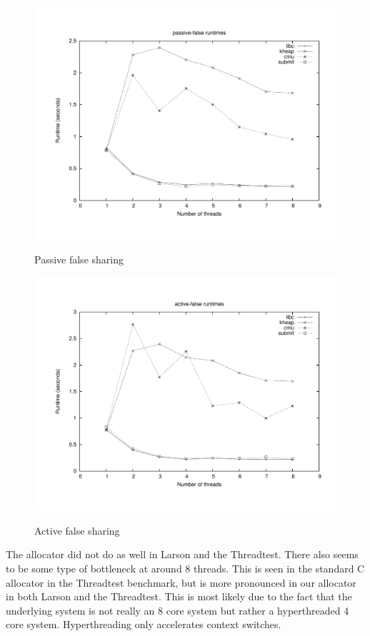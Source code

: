 \documentclass[oneside]{amsart}
\theoremstyle{definition}
\theoremstyle{remark}
\numberwithin{equation}{section}
\begin{document}
\begin{figure}[h]
    \caption{Passive false sharing}
    \centering
    \includegraphics[scale=0.35]{../benchmarks/cache-scratch/cache-scratch.pdf}
    \label{fig:plot}
\end{figure}

\begin{figure}[h]
    \caption{Active false sharing}
    \centering
    \includegraphics[scale=0.35]{../benchmarks/cache-thrash/cache-thrash.pdf}
    \label{fig:plot}
\end{figure}

\newpage 

The allocator did not do as well in Larson and the Threadtest. There also seems to be some type of bottleneck at around 8 threads. This is seen in the standard C allocator in the Threadtest benchmark, but is more pronounced in our allocator in both Larson and the Threadtest. This is most likely due to the fact that the underlying system is not really an 8 core system but rather a hyperthreaded 4 core system. Hyperthreading only accelerates context switches.
\end{document}
